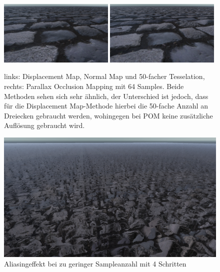 \begin{figure}[ht]
	\includegraphics[width=0.49\textwidth]{Grafiken/Basics/Mapping/Vergleich_DisplacementNormalTesselated.png}
	\includegraphics[width=0.49\textwidth]{Grafiken/Basics/Mapping/Vergleich_POM_64Steps.png}
	\begin{footnotesize}
		\caption{links: Displacement Map, Normal Map und 50-facher Tesselation, rechts: Parallax Occlusion Mapping mit 64 Samples. 
		Beide Methoden sehen sich sehr ähnlich, der Unterschied ist jedoch, dass für die Displacement Map-Methode hierbei die 50-fache Anzahl an
		Dreiecken gebraucht werden, wohingegen bei POM keine zusätzliche Auflösung gebraucht wird.}
	\end{footnotesize}
\end{figure}


\begin{figure}[h]
	\centering
	\includegraphics[width=1\textwidth]{Grafiken/Basics/Mapping/aliasing.png}
	\begin{footnotesize}
		\caption{Aliasingeffekt bei zu geringer Sampleanzahl mit 4 Schritten}
		\label{fig:alias}
	\end{footnotesize}
\end{figure}
